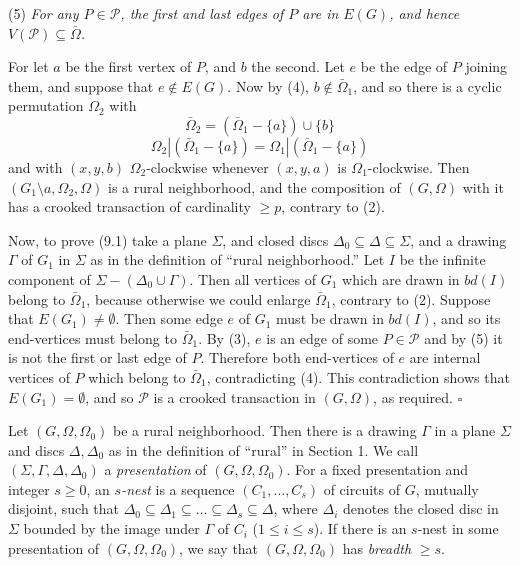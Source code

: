 \hspace*{12pt}(5) \textit{For any $P \in \mathscr{P}$, the first and last edges of $P$ are in $E(G)$, and hence $V(\mathscr{P}) \subseteq \bar{\Omega}$.}

For let $a$ be the first vertex of $P$, and $b$ the second. Let $e$ be the edge of $P$ joining them, and suppose that $e \notin E(G)$. Now by (4), $b \notin \bar{\Omega}_1$, and so there is a cyclic permutation $\Omega_2$ with
\begin{equation*}
\bar{\Omega}_2 = (\bar{\Omega}_1 - \{a\}) \cup \{b\}
\end{equation*}
\begin{equation*}
\Omega_2 | (\bar{\Omega}_1 - \{a\}) = \Omega_1 | (\bar{\Omega}_1 - \{a\})
\end{equation*}
and with $(x, y, b)$ $\Omega_2$-clockwise whenever $(x, y, a)$ is $\Omega_1$-clockwise. Then $(G_1 \setminus a, \Omega_2, \Omega)$ is a rural neighborhood, and the composition of $(G, \Omega)$ with it has a crooked transaction of cardinality $\ge p$, contrary to (2).

Now, to prove (9.1) take a plane $\Sigma$, and closed discs $\Delta_0 \subseteq \Delta \subseteq \Sigma$, and a drawing $\Gamma$ of $G_1$ in $\Sigma$ as in the definition of ``rural neighborhood.'' Let $I$ be the infinite component of $\Sigma - (\Delta_0 \cup \Gamma)$. Then all vertices of $G_1$ which are drawn in $bd(I)$ belong to $\bar{\Omega}_1$, because otherwise we could enlarge $\bar{\Omega}_1$, contrary to (2). Suppose that $E(G_1) \ne \emptyset$. Then some edge $e$ of $G_1$ must be drawn in $bd(I)$, and so its end-vertices must belong to $\bar{\Omega}_1$. By (3), $e$ is an edge of some $P \in \mathscr{P}$ and by (5) it is not the first or last edge of $P$. Therefore both end-vertices of $e$ are internal vertices of $P$ which belong to $\bar{\Omega}_1$, contradicting (4). This contradiction shows that $E(G_1) = \emptyset$, and so $\mathscr{P}$ is a crooked transaction in $(G, \Omega)$, as required. $\square$


Let $(G, \Omega, \Omega_0)$ be a rural neighborhood. Then there is a drawing $\Gamma$ in a plane $\Sigma$ and discs $\Delta, \Delta_0$ as in the definition of ``rural'' in Section 1. We call $(\Sigma, \Gamma, \Delta, \Delta_0)$ a \textit{presentation} of $(G, \Omega, \Omega_0)$. For a fixed presentation and integer $s \ge 0$, an \textit{$s$-nest} is a sequence $(C_1, \dots, C_s)$ of circuits of $G$, mutually disjoint, such that $\Delta_0 \subseteq \Delta_1 \subseteq \dots \subseteq \Delta_s \subseteq \Delta$, where $\Delta_i$ denotes the closed disc in $\Sigma$ bounded by the image under $\Gamma$ of $C_i$ ($1 \le i \le s$). If there is an $s$-nest in some presentation of $(G, \Omega, \Omega_0)$, we say that $(G, \Omega, \Omega_0)$ has \textit{breadth} $\ge s$.

